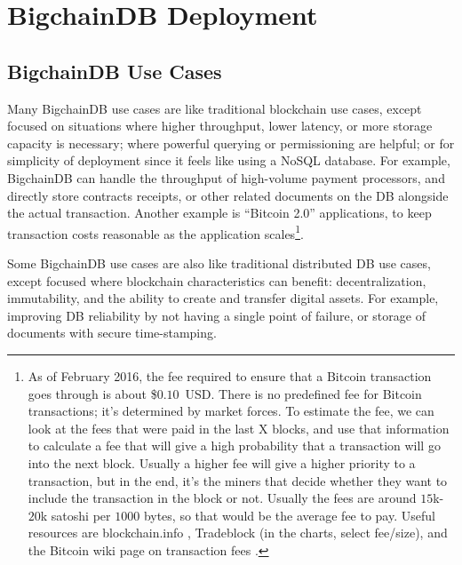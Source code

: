 \section{BigchainDB Deployment}\label{sec:deployment}

\subsection{BigchainDB Use Cases}

Many BigchainDB use cases are like traditional blockchain use cases, except focused on situations where higher throughput, lower latency, or more storage capacity is necessary; where powerful querying or permissioning are helpful; or for simplicity of deployment since it feels like using a NoSQL database.
For example, BigchainDB can handle the throughput of high-volume payment processors, and directly store contracts receipts, or other related documents on the DB alongside the actual transaction.
Another example is “Bitcoin 2.0” applications, to keep transaction costs reasonable as the application scales\footnote{
As of February 2016, the fee required to ensure that a Bitcoin transaction goes through is about \$$0.10$~USD. There is no predefined fee for Bitcoin transactions; it's determined by market forces.
To estimate the fee, we can look at the fees that were paid in the last X blocks, and use that information to calculate a fee that will give a high probability that a transaction will go into the next block.
Usually a higher fee will give a higher priority to a transaction, but in the end, it's the miners that decide whether they want to include the transaction in the block or not.
Usually the fees are around $15$k-$20$k satoshi per $1000$ bytes, so that would be the average fee to pay.
Useful resources are blockchain.info \cite{blockchaininfo2015transaction_fees}, Tradeblock \cite{tradeblock} (in the charts, select fee/size), and the Bitcoin wiki page on transaction fees \cite{bitcoin2015fees}.
}.

Some BigchainDB use cases are also like traditional distributed DB use cases, except focused where blockchain characteristics can benefit: decentralization, immutability, and the ability to create and transfer digital assets. For example, improving DB reliability by not having a single point of failure, or storage of documents with secure time-stamping.

